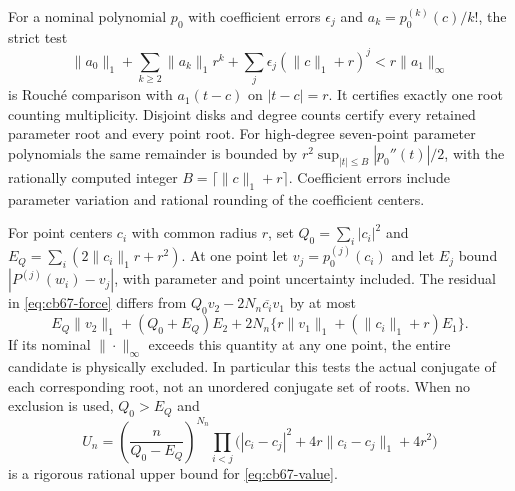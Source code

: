\documentclass[11pt,a4paper]{article}
\theoremstyle{remark}
\begin{document}
For a nominal polynomial $p_0$ with coefficient errors $\epsilon_j$ and
$a_k=p_0^{(k)}(c)/k!$, the strict test
\[
 \|a_0\|_1+\sum_{k\ge2}\|a_k\|_1r^k
       +\sum_j\epsilon_j(\|c\|_1+r)^j
 <r\|a_1\|_\infty
\]
is Rouch\'e comparison with $a_1(t-c)$ on $|t-c|=r$. It certifies exactly
one root counting multiplicity. Disjoint disks and degree counts certify
every retained parameter root and every point root. For high-degree
seven-point parameter polynomials the same remainder is bounded by
$r^2\sup_{|t|\le B}|p_0''(t)|/2$, with the rationally computed integer
$B=\lceil\|c\|_1+r\rceil$.
Coefficient errors include parameter variation and rational rounding of
the coefficient centers.

For point centers $c_i$ with common radius $r$, set
$Q_0=\sum_i|c_i|^2$ and
$E_Q=\sum_i(2\|c_i\|_1r+r^2)$.
At one point let $v_j=p_0^{(j)}(c_i)$ and let $E_j$ bound
$|P^{(j)}(w_i)-v_j|$, with parameter and point uncertainty included.
The residual in \eqref{eq:cb67-force} differs from
$Q_0v_2-2N_n\overline{c_i}v_1$ by at most
\[
 E_Q\|v_2\|_1+(Q_0+E_Q)E_2
 +2N_n\{r\|v_1\|_1+(\|c_i\|_1+r)E_1\}.
\]
If its nominal $\|\cdot\|_\infty$ exceeds this quantity at any one point,
the entire candidate is physically excluded. In particular this tests the
actual conjugate of each corresponding root, not an unordered conjugate
set of roots. When no exclusion is used, $Q_0>E_Q$ and
\begin{equation}\label{eq:cb67-upper}
 U_n=\left(\frac n{Q_0-E_Q}\right)^{N_n}
 \prod_{i<j}\bigl(|c_i-c_j|^2+4r\|c_i-c_j\|_1+4r^2\bigr)
\end{equation}
is a rigorous rational upper bound for \eqref{eq:cb67-value}.
\end{document}
